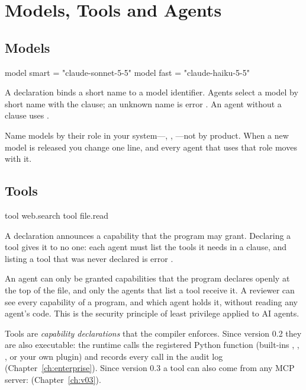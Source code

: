 \chapter{Models, Tools and Agents}
\label{ch:declarations}

\section{Models}

\begin{algo}
model smart = "claude-sonnet-5-5"
model fast  = "claude-haiku-5-5"
\end{algo}

A  declaration binds a short name to a model identifier. Agents select a model by short name with the  clause; an unknown name is error . An agent without a  clause uses .

\begin{tip}
Name models by their role in your system---, , ---not by product. When a new model is released you change one line, and every agent that uses that role moves with it.
\end{tip}

\section{Tools}

\begin{algo}
tool web.search
tool file.read
\end{algo}

A  declaration announces a capability that the program may grant. Declaring a tool gives it to no one: each agent must list the tools it needs in a  clause, and listing a tool that was never declared is error .

\begin{ethics}
An agent can only be granted capabilities that the program declares openly at the top of the file, and only the agents that list a tool receive it. A reviewer can see every capability of a program, and which agent holds it, without reading any agent's code. This is the security principle of least privilege applied to AI agents.
\end{ethics}

\begin{caution}
Tools are \emph{capability declarations} that the compiler enforces. Since version 0.2 they are also executable: the runtime calls the registered Python function (built-ins , , , or your own plugin) and records every call in the audit log (Chapter~\ref{ch:enterprise}). Since version 0.3 a tool can also come from any MCP server:  (Chapter~\ref{ch:v03}).
\end{caution}

